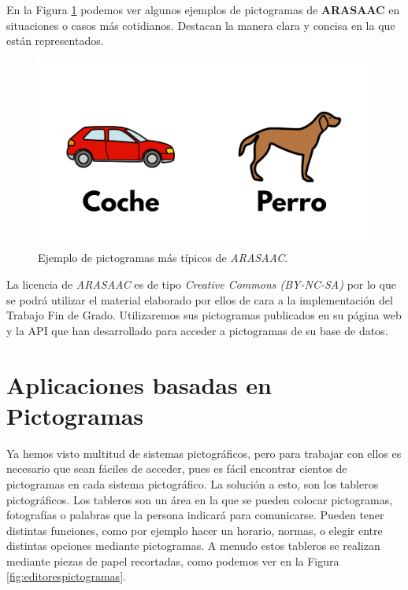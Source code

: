 En la Figura \ref{fig:arasaacpictos} podemos ver algunos ejemplos de pictogramas de \textbf{ARASAAC} en situaciones o casos más cotidianos. Destacan la manera clara y concisa en la que están representados. 

\begin{figure}[h!]
	\centering
	\includegraphics[width=0.7\linewidth]{Imagenes/Bitmap/ARASAACPictos}
	\caption{Ejemplo de pictogramas más típicos de \textit{ARASAAC}.}
	\label{fig:arasaacpictos}
\end{figure}

La licencia de \textit{ARASAAC} es de tipo \textit{Creative Commons (BY-NC-SA)} por lo que se podrá utilizar el material elaborado por ellos de cara a la implementación del Trabajo Fin de Grado. Utilizaremos sus pictogramas publicados en su página web y la API que han desarrollado para acceder a pictogramas de su base de datos.

\section{Aplicaciones basadas en Pictogramas}
\label{cap3:sec:editor-tableros}

Ya hemos visto multitud de sistemas pictográficos, pero para trabajar con ellos es necesario que sean fáciles de acceder, pues es fácil encontrar cientos de pictogramas en cada sistema pictográfico. La solución a esto, son los tableros pictográficos. Los tableros son un área en la que se pueden colocar pictogramas, fotografías o palabras que la persona indicará para comunicarse. Pueden tener distintas funciones, como por ejemplo hacer un horario, normas, o elegir entre distintas opciones mediante pictogramas. A menudo estos tableros se realizan mediante piezas de papel recortadas, como podemos ver en la Figura \ref{fig:editorespictogramas}.


